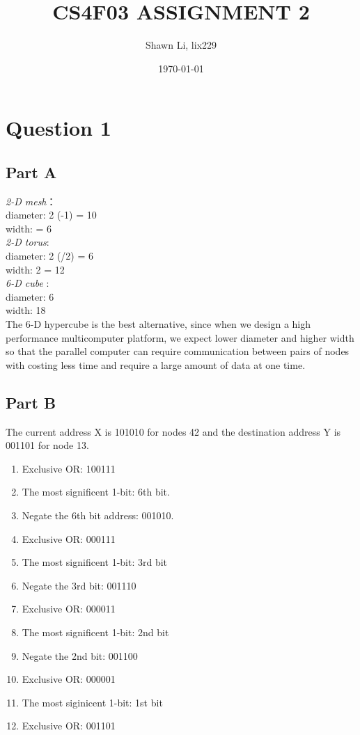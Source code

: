 \documentclass[11pt]{article}
\author{Shawn Li, lix229}
\date{\today}
\title{CS4F03 ASSIGNMENT 2}
\begin{document}
\maketitle
\tableofcontents

\newpage

\section{Question 1}
\label{sec:org75975a8}

\subsection{Part A}
\label{sec:org3b25f8b}
\emph{2-D mesh}：\\
 	diameter: 2 \texttimes{} (-1) = 10 \\
 	width:  = 6 \\
\emph{2-D torus}: \\
	diameter: 2 \texttimes{} (/2) = 6 \\
	width: 2 \texttimes{}  = 12\\
\emph{6-D cube} : \\
	diameter: 6\\
	width: 18\\

The 6-D hypercube is the best alternative, since when we design a high performance multicomputer platform, we expect lower diameter and higher width so that the parallel computer can require communication  between pairs of nodes with costing less time and require a large amount of data at one time.

\subsection{Part B}
\label{sec:org906425f}
The current address X is 101010 for nodes 42 and the destination address Y is 001101 for node 13.
\begin{enumerate}
\item Exclusive OR: 100111
\item The most significent 1-bit: 6th bit.
\item Negate the 6th bit address: 001010.
\item Exclusive OR: 000111
\item The most significent 1-bit: 3rd bit
\item Negate the 3rd bit: 001110
\item Exclusive OR: 000011
\item The most significent 1-bit: 2nd bit
\item Negate the 2nd bit: 001100
\item Exclusive OR: 000001
\item The most siginicent 1-bit: 1st bit
\item Exclusive OR: 001101
\end{enumerate}
\end{document}
